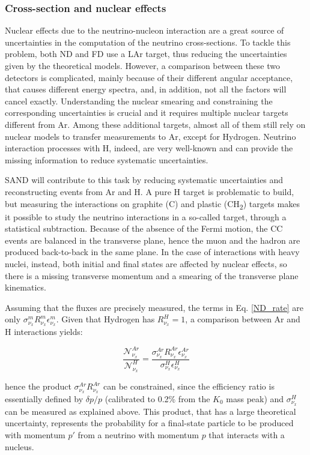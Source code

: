 \subsubsection{Cross-section and nuclear effects}
Nuclear effects due to the neutrino-nucleon interaction are a great source of uncertainties in the computation of the neutrino cross-sections. To tackle this problem, both ND and FD use a LAr target, thus reducing the uncertainties given by the theoretical models. %
However, a comparison between these two detectors is complicated, mainly because of their different angular acceptance, that causes different energy spectra, and, in addition, not all the factors will cancel exactly. Understanding the nuclear smearing and constraining the corresponding uncertainties is crucial and it requires multiple nuclear targets different from Ar. Among these additional targets, almost all of them still rely on nuclear models to transfer measurements to Ar, except for Hydrogen. Neutrino interaction processes with H, indeed, are very well-known and can provide the missing information to reduce systematic uncertainties.

SAND will contribute to this task by reducing systematic uncertainties and reconstructing events from Ar and H. A pure H target is problematic to build, but measuring the interactions on graphite (C) and plastic (CH\textsubscript{2}) targets makes it possible to study the neutrino interactions in a so-called  target, through a statistical subtraction. Because of the absence of the Fermi motion, the CC events are balanced in the transverse plane, hence the muon and the hadron are produced back-to-back in the same plane. In the case of interactions with heavy nuclei, instead, both initial and final states are affected by nuclear effects, so there is a missing transverse momentum and a smearing of the transverse plane kinematics.

Assuming that the fluxes are precisely measured, the terms in Eq. \ref{ND_rate} are only $\sigma^m_{\nu_x}R^m_{\nu_x}\epsilon^m_{\nu_x}$. Given that Hydrogen has $R^H_{\nu_x} = 1$, a comparison between Ar and H interactions yields: 

\begin{equation}
    \frac{\mathcal{N}^{Ar}_{\nu_x}}{\mathcal{N}^H_{\nu_x}} = \frac{\sigma^{Ar}_{\nu_x}R^{Ar}_{\nu_x}\epsilon^{Ar}_{\nu_x}}{\sigma^H_{\nu_x}\epsilon^H_{\nu_x}}
\end{equation}

hence the product $\sigma^{Ar}_{\nu_x}R^{Ar}_{\nu_x}$ can be constrained, since the efficiency ratio is essentially defined by $\delta p/p$ (calibrated to 0.2\% from the $K_0$ mass peak) and $\sigma^H_{\nu_x}$ can be measured as explained above. This product, that has a large theoretical uncertainty, represents the probability for a final-state particle to be produced with momentum $p'$ from a neutrino with momentum $p$ that interacts with a nucleus. 

